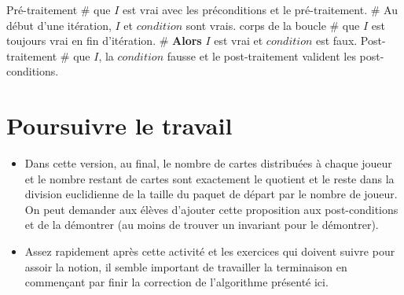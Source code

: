 \begin{algo}[vlined]
Pré-traitement\;
\#  que $I$ est vrai avec les préconditions et le pré-traitement.\;
   {  
  \# Au début d'une itération, $I$ et $condition$ sont vrais.\;
  corps de la boucle\;  
  \#  que $I$ est toujours vrai en fin d'itération.\;}
\# {\bfseries Alors} $I$ est vrai et $condition$ est faux.\;
Post-traitement\;
\#  que $I$, la $condition$ fausse et le post-traitement valident les post-conditions.\;
\end{algo}


\section{Poursuivre le travail}

\begin{itemize}
	\item Dans cette version, au final, le nombre de cartes distribuées à chaque joueur et le nombre restant de cartes sont exactement le quotient et le reste dans la division euclidienne de la taille du paquet de départ par le nombre de joueur. On peut demander aux élèves d'ajouter cette proposition aux post-conditions et de la démontrer (au moins de trouver un invariant pour le démontrer).
	\item Assez rapidement après cette activité et les exercices qui doivent suivre pour assoir la notion, il semble important de travailler la terminaison en commençant par finir la correction de l'algorithme présenté ici.
\end{itemize}